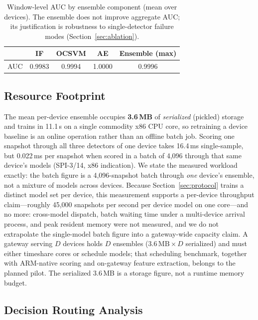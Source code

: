 \documentclass[sigconf,review,anonymous]{acmart}
\begin{document}
\begin{table}[t]
\caption{Window-level AUC by ensemble component (mean over devices). The ensemble does not improve aggregate AUC; its justification is robustness to single-detector failure modes (Section~\ref{sec:ablation}).}
\label{tab:ablation}
\small
\begin{tabular}{@{}lcccc@{}}
\toprule
 & IF & OCSVM & AE & Ensemble (max) \\
\midrule
AUC & 0.9983 & 0.9994 & 1.0000 & 0.9996 \\
\bottomrule
\end{tabular}
\end{table}

\subsection{Resource Footprint}
\label{sec:resources}

The mean per-device ensemble occupies \textbf{3.6\,MB} of \emph{serialized} (pickled) storage and trains in 11.1\,s on a single commodity x86 CPU core, so retraining a device baseline is an online operation rather than an offline batch job. Scoring one snapshot through all three detectors of one device takes 16.4\,ms single-sample, but 0.022\,ms per snapshot when scored in a batch of 4{,}096 through that same device's models (SPI-3/14, x86 indication). We state the measured workload exactly: the batch figure is a 4{,}096-snapshot batch through \emph{one} device's ensemble, not a mixture of models across devices. Because Section~\ref{sec:protocol} trains a distinct model set per device, this measurement supports a per-device throughput claim---roughly 45{,}000 snapshots per second per device model on one core---and no more: cross-model dispatch, batch waiting time under a multi-device arrival process, and peak resident memory were not measured, and we do not extrapolate the single-model batch figure into a gateway-wide capacity claim. A gateway serving $D$ devices holds $D$ ensembles ($3.6\,\mathrm{MB} \times D$ serialized) and must either timeshare cores or schedule models; that scheduling benchmark, together with ARM-native scoring and on-gateway feature extraction, belongs to the planned pilot. The serialized 3.6\,MB is a storage figure, not a runtime memory budget.

\subsection{Decision Routing Analysis}
\label{sec:routing}
\end{document}
